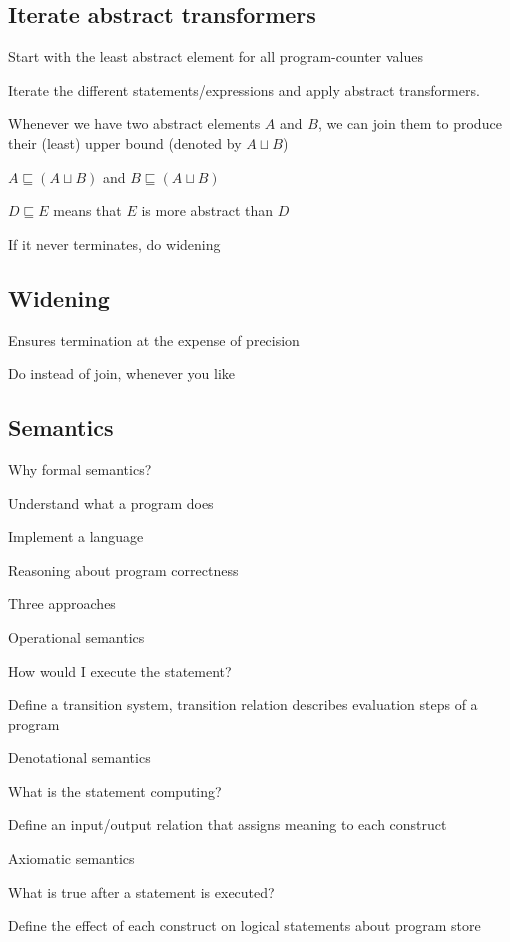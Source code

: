 \subsection{Iterate abstract transformers}
\enumstart
	\item Start with the least abstract element for all program-counter values
	\item Iterate the different statements/expressions and apply abstract transformers.
	\item Whenever we have two abstract elements $A$ and $B$, we can join them to produce their (least) upper bound (denoted by $A \sqcup B$)
	\item $A \sqsubseteq (A \sqcup B)$ and $B \sqsubseteq (A \sqcup B)$
	\item $D \sqsubseteq E$ means that $E$ is more abstract than $D$
	\item If it never terminates, do widening
\enumend

\subsection{Widening}
\enumstart
	\item Ensures termination at the expense of precision
	\item Do instead of join, whenever you like
\enumend

\subsection{Semantics}
\enumstart
	\item Why formal semantics?
	\enumstart
		\item Understand what a program does
		\item Implement a language
		\item Reasoning about program correctness
	\enumend
	\item Three approaches
	\enumstart
		\item Operational semantics
		\enumstart
			\item How would I execute the statement?
			\item Define a transition system, transition relation describes evaluation steps of a program
		\enumend
		\item Denotational semantics
		\enumstart
			\item What is the statement computing?
			\item Define an input/output relation that assigns meaning to each construct
		\enumend
		\item Axiomatic semantics
		\enumstart
			\item What is true after a statement is executed?
			\item Define the effect of each construct on logical statements about program store
		\enumend
	\enumend
\enumend

